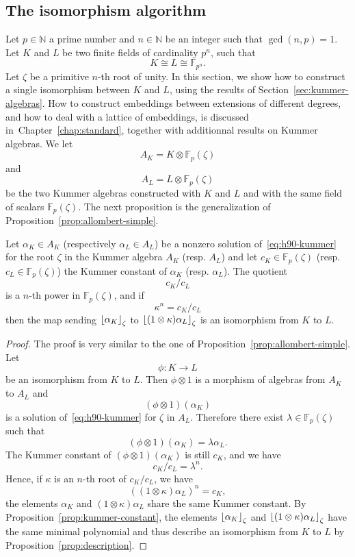 \subsection{The isomorphism algorithm}
\label{sec:lenstra-allombert-isomorphism}

Let $p\in\mathbb{N}$ a prime number and $n\in\mathbb{N}$ be an integer such that
$\gcd(n, p)=1$. Let $K$ and $L$ be two finite fields of cardinality $p^n$, such
that
\[
  K\cong L\cong \mathbb{F}_{p^n}.
\]
Let $\zeta$ be a primitive $n$-th root of unity. In this section, we show how to
construct a single isomorphism between $K$ and $L$, using the results of
Section~\ref{sec:kummer-algebras}. How to construct embeddings
between extensions of different degrees, and how to deal with a lattice of
embeddings, is discussed in~Chapter~\ref{chap:standard}, together with
additionnal results on Kummer algebras. We let
\[
  A_K = K\otimes\mathbb{F}_p(\zeta)
\]
and
\[
  A_L = L\otimes\mathbb{F}_{p}(\zeta)
\]
be the two Kummer algebras constructed with $K$ and $L$ and with the same field of
scalars $\mathbb{F}_{p}(\zeta)$. The next proposition is the generalization of
Proposition~\ref{prop:allombert-simple}.
\begin{prop}
  \label{prop:lenstra-allombert-algorithm}
 Let $\alpha_K\in A_K$ (respectively $\alpha_L\in A_L$) be a nonzero solution
 of~\eqref{eq:h90-kummer} for the root $\zeta$ in the Kummer algebra $A_K$
 (resp. $A_L$) and let $c_K\in\mathbb{F}_{p}(\zeta)$ (resp.
 $c_L\in\mathbb{F}_p(\zeta)$) the Kummer constant of $\alpha_K$
 (resp. $\alpha_L$). The quotient
 \[
   c_K/c_L
 \]
 is a $n$-th power in $\mathbb{F}_p(\zeta)$, and if
 \[
   \kappa^n = c_K/c_L
 \]
 then the map sending $\left\lfloor \alpha_K \right\rfloor_{\zeta}$ to
 $\left\lfloor (1\otimes\kappa)\alpha_L \right\rfloor_{\zeta}$ is an isomorphism from $K$ to $L$.
\end{prop}
\begin{proof}
  The proof is very similar to the one of
  Proposition~\ref{prop:allombert-simple}. Let
  \[
    \phi:K\to L
  \]
  be an isomorphism from $K$ to $L$. Then $\phi\otimes1$ is a morphism of
  algebras from $A_K$ to $A_L$ and
  \[
    (\phi\otimes1)(\alpha_K)
  \]
  is a solution of~\eqref{eq:h90-kummer} for $\zeta$ in $A_L$. Therefore
  there exist $\lambda\in\mathbb{F}_p(\zeta)$ such that
  \[
    (\phi\otimes1)(\alpha_K) = \lambda\alpha_L.
  \]
  The Kummer constant of $(\phi\otimes1)(\alpha_K)$ is still $c_K$, and we have
  \[
    c_K/c_L = \lambda^n.
  \]
  Hence, if $\kappa$ is an $n$-th root of $c_K/c_L$, we have
  \[
    ((1\otimes\kappa)\alpha_L)^n = c_K,
  \]
  \ie the elements $\alpha_K$ and $(1\otimes\kappa)\alpha_L$ share the same
  Kummer constant. By Proposition~\ref{prop:kummer-constant}, the elements
  $\left\lfloor \alpha_K \right\rfloor_{\zeta}$ and $\left\lfloor (1\otimes\kappa)\alpha_L \right\rfloor_{\zeta}$ have
  the same minimal polynomial and thus describe an isomorphism from $K$ to $L$
  by Proposition~\ref{prop:description}.
\end{proof}
